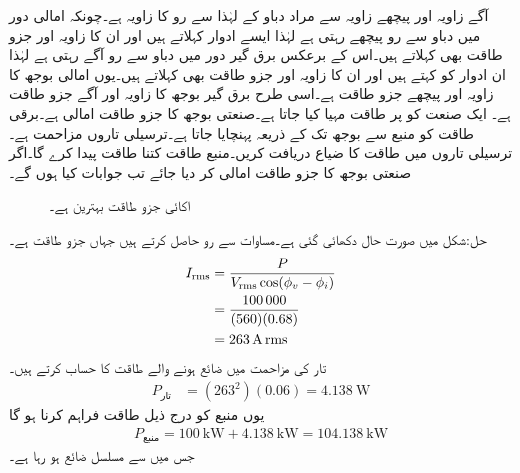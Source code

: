 آگے زاویہ اور پیچھے زاویہ سے مراد دباو کے لہٰذا سے رو کا زاویہ ہے۔چونکہ امالی دور میں دباو سے رو پیچھے رہتی ہے لہٰذا ایسے ادوار  کہلاتے ہیں اور ان کا زاویہ اور جزو طاقت بھی  کہلاتے ہیں۔اس کے برعکس برق گیر دور میں دباو سے رو آگے رہتی ہے لہٰذا ان ادوار کو  کہتے ہیں اور ان کا زاویہ اور جزو طاقت بھی  کہلاتے ہیں۔یوں امالی بوجھ  کا زاویہ   اور پیچھے جزو طاقت  ہے۔اسی طرح برق گیر بوجھ  کا زاویہ  اور آگے جزو طاقت  ہے۔
ایک صنعت کو  پر  طاقت مہیا کیا جاتا ہے۔صنعتی بوجھ کا جزو طاقت  امالی ہے۔برقی طاقت کو منبع سے بوجھ تک  کے ذریعہ پہنچایا جاتا ہے۔ترسیلی تاروں مزاحمت  ہے۔ترسیلی تاروں میں طاقت کا ضیاع دریافت کریں۔منبع طاقت کتنا طاقت پیدا کرے گا۔اگر صنعتی بوجھ کا جزو طاقت  امالی کر دیا جائے تب جوابات کیا ہوں گے۔
\begin{figure}
\centering
{}
\caption{اکائی جزو طاقت بہترین ہے۔}
\label{شکل_طاقت_جزو_طاقت_کے_اثرات}
\end{figure}

حل:شکل  میں صورت حال دکھائی گئی ہے۔مساوات  سے رو حاصل کرتے ہیں جہاں  جزو طاقت ہے۔
\begin{align*}
{\ensuremath{I_{\textup{rms}}}}&=\frac{P}{{V_{\textup{rms}}} \cos(\phi_v-\phi_i)}\\
&=\frac{\num{100000}}{(560)(0.68)}\\
&=\SI{263}{\ampere}\,{\textup{rms}}
\end{align*}
تار کی مزاحمت میں ضائع ہونے والے طاقت کا حساب کرتے ہیں۔
\begin{align*}
P_{\text{تار}}&=(263^2)(0.06)=\SI{4.138}{\watt}
\end{align*}
یوں منبع کو درج ذیل طاقت فراہم کرنا ہو گا
\begin{align*}
P_{\text{منبع}}=\SI{100}{\kilo\watt}+\SI{4.138}{\kilo\watt}=\SI{104.138}{\kilo\watt}
\end{align*} 
جس میں سے  مسلسل ضائع ہو رہا ہے۔

